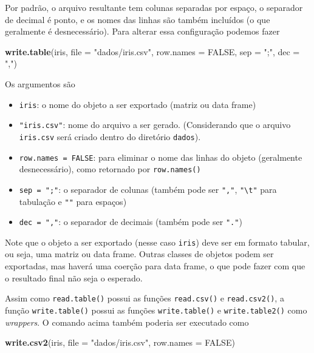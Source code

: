 \documentclass[10pt,a4paper]{book}
\newenvironment{Shaded}{\begin{snugshade}}{\end{snugshade}}
\newcommand{\KeywordTok}[1]{\textcolor[rgb]{0.13,0.29,0.53}{\textbf{#1}}}
\newcommand{\DataTypeTok}[1]{\textcolor[rgb]{0.13,0.29,0.53}{#1}}
\newcommand{\StringTok}[1]{\textcolor[rgb]{0.31,0.60,0.02}{#1}}
\newcommand{\OtherTok}[1]{\textcolor[rgb]{0.56,0.35,0.01}{#1}}
\newcommand{\NormalTok}[1]{#1}
\providecommand{\tightlist}{%
  \setlength{\itemsep}{0pt}\setlength{\parskip}{0pt}}
\begin{document}
Por padrão, o arquivo resultante tem colunas separadas por espaço, o
separador de decimal é ponto, e os nomes das linhas são também incluídos
(o que geralmente é desnecessário). Para alterar essa configuração
podemos fazer

\begin{Shaded}
\begin{Highlighting}[]
\KeywordTok{write.table}\NormalTok{(iris, }\DataTypeTok{file =} \StringTok{"dados/iris.csv"}\NormalTok{, }\DataTypeTok{row.names =} \OtherTok{FALSE}\NormalTok{,}
            \DataTypeTok{sep =} \StringTok{";"}\NormalTok{, }\DataTypeTok{dec =} \StringTok{","}\NormalTok{)}
\end{Highlighting}
\end{Shaded}

Os argumentos são

\begin{itemize}
\tightlist
\item
  \texttt{iris}: o nome do objeto a ser exportado (matriz ou data frame)
\item
  \texttt{"iris.csv"}: nome do arquivo a ser gerado. (Considerando que o
  arquivo \texttt{iris.csv} será criado dentro do diretório
  \texttt{dados}).
\item
  \texttt{row.names\ =\ FALSE}: para eliminar o nome das linhas do
  objeto (geralmente desnecessário), como retornado por
  \texttt{row.names()}
\item
  \texttt{sep\ =\ ";"}: o separador de colunas (também pode ser
  \texttt{","}, \texttt{"\textbackslash{}t"} para tabulação e
  \texttt{""} para espaços)
\item
  \texttt{dec\ =\ ","}: o separador de decimais (também pode ser
  \texttt{"."})
\end{itemize}

Note que o objeto a ser exportado (nesse caso \texttt{iris}) deve ser em
formato tabular, ou seja, uma matriz ou data frame. Outras classes de
objetos podem ser exportadas, mas haverá uma coerção para data frame, o
que pode fazer com que o resultado final não seja o esperado.

Assim como \texttt{read.table()} possui as funções \texttt{read.csv()} e
\texttt{read.csv2()}, a função \texttt{write.table()} possui as funções
\texttt{write.table()} e \texttt{write.table2()} como \emph{wrappers}. O
comando acima também poderia ser executado como

\begin{Shaded}
\begin{Highlighting}[]
\KeywordTok{write.csv2}\NormalTok{(iris, }\DataTypeTok{file =} \StringTok{"dados/iris.csv"}\NormalTok{, }\DataTypeTok{row.names =} \OtherTok{FALSE}\NormalTok{)}
\end{Highlighting}
\end{Shaded}
\end{document}

